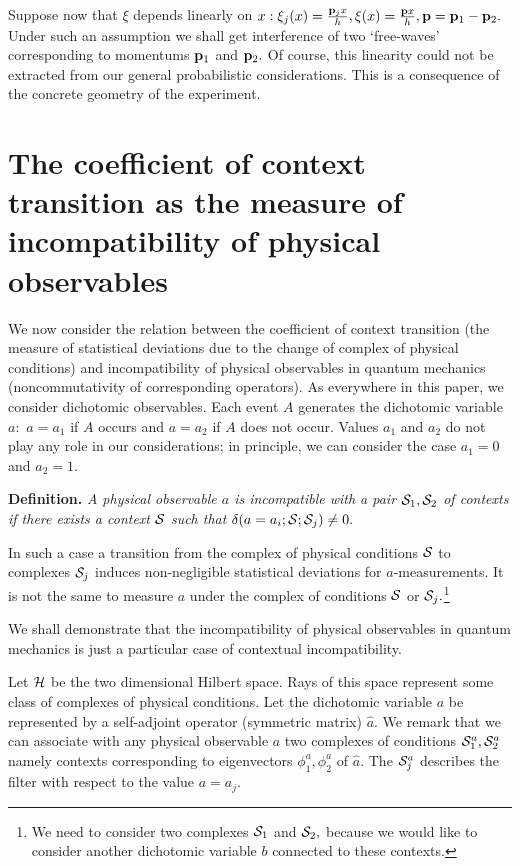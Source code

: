 \documentclass[12pt,oneside,final,a4paper]{article}
\begin{document}
Suppose now that $\xi$ depends linearly on $x: \xi_j(x)= \frac{{\bf p}_j x}{h}, \xi(x)= \frac{{\bf p} x}{h}, 
{\bf p} ={\bf p}_1 - {\bf p}_2.$ Under such an assumption we shall get interference
of two `free-waves' corresponding to momentums ${\bf p}_1$ and ${\bf p}_2.$ Of course, this
linearity could not be extracted from  our general probabilistic considerations. This is a
consequence of the concrete geometry of the experiment.

\section{The coefficient of context transition as the measure of incompatibility of physical
observables}

We now consider the relation between the coefficient of context transition
(the measure of statistical deviations due to the change of complex of physical conditions)
and incompatibility of physical observables in quantum mechanics (noncommutativity of
corresponding operators). As everywhere in this paper, we consider dichotomic observables.
Each event $A$ generates the dichotomic variable $a:$ $a=a_1$ if $A$ occurs and $a=a_2$ if $A$ does not
occur. Values $a_1$ and $a_2$ do not play any role in our considerations; in principle,
we can consider the case $a_1=0$ and $a_2=1.$

{\bf Definition.} {\it A physical observable $a$ is incompatible with a pair ${\cal S}_1, {\cal S}_2$ of contexts 
if there exists  a context ${\cal S}$  such
that $\delta(a=a_i; {\cal S}; {\cal S}_j)\not=0.$}

In such a case a transition from the complex of physical conditions ${\cal S}$ to complexes
${\cal S}_j$ induces non-negligible statistical deviations for $a$-measurements. It is not the same
to measure $a$ under the complex of conditions ${\cal S}$ or ${\cal S}_j.$\footnote{
We need to consider two complexes ${\cal S}_1$ and ${\cal S}_2,$ because we would like to 
consider another dichotomic variable $b$ connected to these contexts.}

We shall demonstrate that the incompatibility of physical observables in quantum mechanics
is just a particular case of contextual incompatibility. 

Let ${\cal H}$ be the two dimensional Hilbert space. Rays of this space represent 
some class of complexes of physical conditions. 
Let the dichotomic variable $a$ be represented  by a self-adjoint operator (symmetric
matrix) $\hat{a}.$ We remark that we can associate with any physical observable $a$ 
two complexes of conditions ${\cal S}_1^a, {\cal S}_2^a$ 
namely contexts corresponding to eigenvectors $\phi_1^a, \phi_2^a$ of  $\hat{a}.$ 
The ${\cal S}_j^a$ describes the filter with respect to the value $a=a_j$.
\end{document}
